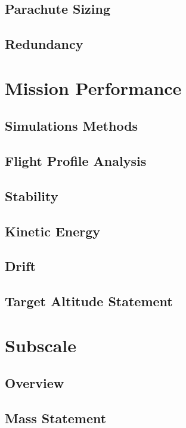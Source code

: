     \subsection{Parachute Sizing}
    
    \subsection{Redundancy}
    
\section{Mission Performance}

    \subsection{Simulations Methods}
    
    \subsection{Flight Profile Analysis}
    
    \subsection{Stability}
    
    \subsection{Kinetic Energy}
    
    \subsection{Drift}
    
    \subsection{Target Altitude Statement}

\section{Subscale}

    \subsection{Overview}
    
    \subsection{Mass Statement}
    

